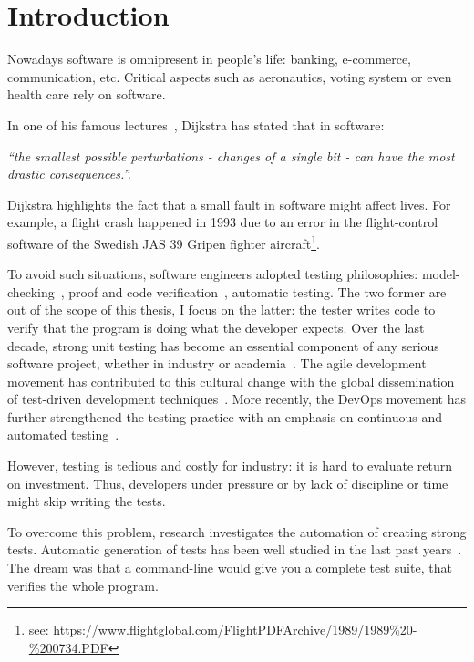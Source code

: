 \chapter{Introduction}
\label{chap:introduction}

\minitoc

\graphicspath{{.}{chapitres/introduction/}}

Nowadays software is omnipresent in people's life: banking, e-commerce, communication, etc. 
Critical aspects such as aeronautics, voting system or even health care rely on software.

In one of his famous lectures~\cite{DijkstraLecture1989}, Dijkstra has stated that in software: 
\begin{center}
	\emph{``the smallest possible perturbations - \ie changes of a single bit - can have the most drastic consequences.''.}
\end{center}

Dijkstra highlights the fact that a small fault in software might affect lives.
For example, a flight crash happened in 1993 due to an error in the flight-control software of the Swedish JAS 39 Gripen fighter aircraft\footnote{see: \url{https://www.flightglobal.com/FlightPDFArchive/1989/1989\%20-\%200734.PDF}}.

To avoid such situations, software engineers adopted testing philosophies: model-checking~\cite{10.1007/978-3-540-28644-8_3}, proof and code verification~\cite{4544862}, automatic testing.
The two former are out of the scope of this thesis, I focus on the latter: the tester writes code to verify that the program is doing what the developer expects.
Over the last decade, strong unit testing has become an essential component of any serious software project, whether in industry or academia~\cite{BellerTSE,beller2015when,beller2015howmuch}.
The agile development movement has contributed to this cultural change with the global dissemination of test-driven development techniques~\cite{beck2003test}.
More recently, the DevOps movement has further strengthened the testing practice with an emphasis on continuous and automated testing~\cite{Roche2013Devops}.

However, testing is tedious and costly for industry: it is hard to evaluate return on investment.
Thus, developers under pressure or by lack of discipline or time might skip writing the tests.

To overcome this problem, research investigates the automation of creating strong tests.
Automatic generation of tests has been well studied in the last past years~\cite{ESECFSE11, PachecoE2005}.
The dream was that a command-line would give you a complete test suite, that verifies the whole program.

